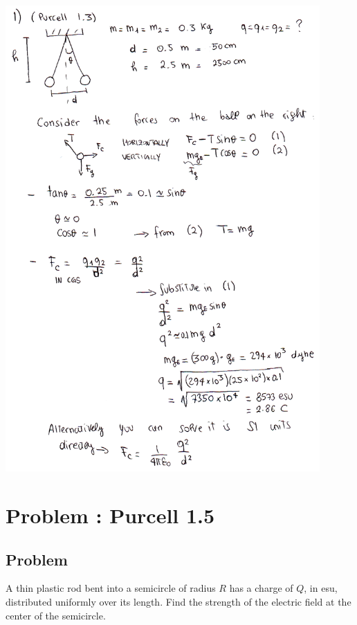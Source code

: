 \documentclass[solutions]{esg8022pset}
\begin{document}
  \begin{center}\includegraphics[width=0.9\textwidth]{ps01_sol_01}\end{center}
\section{Problem \thesection: Purcell 1.5}
\subsection{Problem}
  A thin plastic rod bent into a semicircle of radius $R$ has a charge of $Q$, in esu, distributed uniformly over its length. Find the strength of the electric field at the center of the semicircle.
\end{document}
